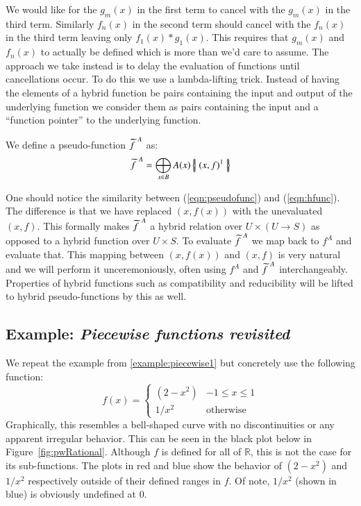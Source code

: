 We would like for the $g_m(x)$ in the first term to cancel with the $g_m(x)$ in the third term.
Similarly $f_n(x)$ in the second term should cancel with the $f_n(x)$ in the third term leaving only $f_1(x) * g_1(x)$.
This requires that $g_m(x)$ and $f_n(x)$ to actually be defined which is more than we'd care to assume.
The approach we take instead is to delay the evaluation of functions until cancellations occur.
To do this we use a lambda-lifting trick.
Instead of having the elements of a hybrid function be pairs containing the input and output of the underlying function 
we consider them as pairs containing the input and a ``function pointer'' to the underlying function.


\begin{definition}
	We define a pseudo-function $\pseudo{f\;}^A$ as:
	\begin{equation}
		\label{eqn:pseudofunc}
 		\pseudo{f\;}^A = \bigoplus_{x \in B} A(x) \hset{(x,f)^1}
	\end{equation}
\end{definition}


One should notice the similarity between (\ref{eqn:pseudofunc}) and (\ref{eqn:hfunc}).
The difference is that we have replaced $(x, f(x))$ with the unevaluated $(x,f)$.
This formally makes $\pseudo{f\;}^A$ a hybrid relation over $U \times (U \to S)$ as opposed to 
a hybrid function over $U \times S$.
To evaluate $\pseudo{f\;}^A$ we map back to $f^A$ and evaluate that.
This mapping between $(x,f(x))$ and $(x,f)$ is very natural and we will perform it unceremoniously,
often using $f^A$ and $\pseudo{f\;}^A$ interchangeably. 
Properties of hybrid functions such as compatibility and reducibility will be lifted to hybrid pseudo-functions by this as well.


\subsection{Example: \emph{Piecewise functions revisited}}


We repeat the example from \ref{example:piecewise1} but concretely use the following function:
\begin{equation*}
	f(x) = \begin{cases}
		(2-x^2) & -1 \leq x \leq 1\\
		1/x^2 & \text{otherwise}
	\end{cases}
\end{equation*}
Graphically, this resembles a bell-shaped curve with no discontinuities or any apparent irregular behavior. 
This can be seen in the black plot below in Figure~\ref{fig:pwRational}.
Although $f$ is defined for all of $\mathbb{R}$, this is not the case for its sub-functions. 
The plots in red and blue show the behavior of $(2-x^2)$ and $1/x^2$ respectively outside of their defined ranges in $f$.
Of note, $1/x^2$ (shown in blue) is obviously undefined at 0.


